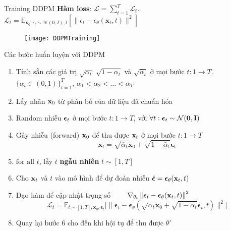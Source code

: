 \begin{frame}{Training DDPM}
	\textbf{Hàm loss}: $\mathcal{L} = \sum_{t=1}^{T} \mathcal{L}_t$. $\mathcal{L}_{t}= \mathbb{E}_{\mathbf{x}_{0}, \epsilon_t \sim \mathcal{N}(0, I), t} \left[ \| \epsilon_t - \epsilon_\theta(\mathbf{x}_t, t) \|^2 \right]$
	
	\begin{figure}
		\centering
		\texttt{[image: DDPMTraining]}
	\end{figure}
\end{frame}

\begin{frame}{Các bước huấn luyện với DDPM}
	
	\begin{enumerate}
		\item Tính sẵn các giá trị $\sqrt{\alpha_t}$ $\sqrt{1 - \alpha_t}$ và $\sqrt{\bar{\alpha}_t}$ ở mọi bước $t: 1 \rightarrow T$.
		$\{\alpha_t \in (0, 1)\}_{t=1}^T$, $\alpha_1 < \alpha_2 < \dots < \alpha_T$
		\item Lấy nhãn $\mathbf{x}_0$ từ phân bố của dữ liệu đã chuẩn hóa
		\item Random nhiễu ${\boldsymbol{\epsilon}}_t$ ở mọi bước $t: 1 \rightarrow T$, với  $\forall t:  {\boldsymbol{\epsilon}}_t \sim\mathcal{N}(\mathbf{0},\mathbf{I})$
		\item Gây nhiễu (forward) $\mathbf{x}_0$ để thu được $\mathbf{x}_t$ ở mọi bước $t: 1 \rightarrow T$
		$$
		\mathbf{x}_t = \sqrt{\bar{\alpha}_t}\mathbf{x}_0 + \sqrt{1 - \bar{\alpha}_t}\boldsymbol{\epsilon}_t
		$$
		\item $\text{for all}$ $t$, lẫy $t$ \textbf{ngẫu nhiên} $t \sim [1, T]$
		\item Cho $\mathbf{x}_t$ và $t$ vào mô hình để dự đoán nhiễu $\hat{{\boldsymbol{\epsilon}}} = {\boldsymbol{\epsilon}}_\theta(\mathbf{x}_t, t)$
		\item Đạo hàm để cập nhật trọng số $\qquad \nabla_{\theta_t} \left\| {\boldsymbol{\epsilon}}_t - {\boldsymbol{\epsilon}}_\theta(\mathbf{x}_t, t) \right\|^2$
		$$
			\mathcal{L}_t = \mathbb{E}_{t \sim [1, T], \mathbf{x}_0, \boldsymbol{\epsilon}_t} \Big[\|\boldsymbol{\epsilon}_t - \boldsymbol{\epsilon}_\theta(\sqrt{\bar{\alpha}_t}\mathbf{x}_0 + \sqrt{1 - \bar{\alpha}_t}\boldsymbol{\epsilon}_t, t)\|^2 \Big]
		$$
		\item Quay lại bước 6 cho đến khi hội tụ để thu được $\theta'$
	\end{enumerate}
\end{frame}

